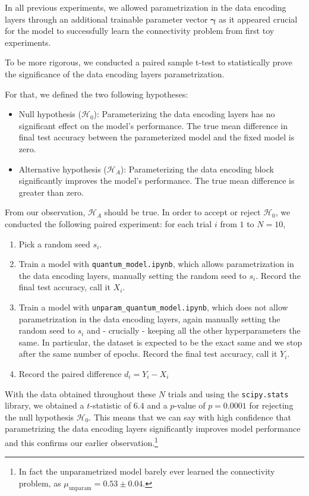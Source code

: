 \documentclass{article}
\theoremstyle{definition}
\theoremstyle{plain}
\begin{document}
In all previous experiments, we allowed parametrization in the data encoding layers through an additional trainable parameter vector $\boldsymbol{\gamma}$ as it appeared crucial for the model to successfully learn the connectivity problem from first toy experiments. 

To be more rigorous, we conducted a paired sample t-test to statistically prove the significance of the data encoding layers parametrization. 

For that, we defined the two following hypotheses:
\begin{itemize}
    \item Null hypothesis ($\mathcal{H}_0$): Parameterizing the data encoding layers has no significant effect on the model's performance. The true mean difference in final test accuracy between the parameterized model and the fixed model is zero.
    \item Alternative hypothesis ($\mathcal{H}_A$): Parameterizing the data encoding block significantly improves the model's performance. The true mean difference is greater than zero.
\end{itemize}
From our observation, $\mathcal{H}_A$ should be true. In order to accept or reject $\mathcal{H}_0$, we conducted the following paired experiment:
for each trial $i$ from $1$ to $N=10$,
\begin{enumerate}
    \item Pick a random seed $s_i$. 
    \item Train a model with \texttt{quantum\_model.ipynb}, which allows parametrization in the data encoding layers, manually setting the random seed to $s_i$. Record the final test accuracy, call it $X_i$.
    \item Train a model with \texttt{unparam\_quantum\_model.ipynb}, which does not allow parametrization in the data encoding layers, again manually setting the random seed to $s_i$ and - crucially - keeping all the other hyperparameters the same. In particular, the dataset is expected to be the exact same and we stop after the same number of epochs. Record the final test accuracy, call it $Y_i$.
    \item Record the paired difference $d_i = Y_i - X_i$
\end{enumerate}

With the data obtained throughout these $N$ trials and using the \texttt{scipy.stats} library, we obtained a $t$-statistic of $6.4$ and a $p$-value of $p = 0.0001$ for rejecting the null hypothesis $\mathcal{H}_0$. This means that we can say with high confidence that parametrizing the data encoding layers significantly improves model performance and this confirms our earlier observation.\footnote{In fact the unparametrized model barely ever learned the connectivity problem, as $\mu_{\text{unparam}} = 0.53 \pm0.04$.}
\end{document}

